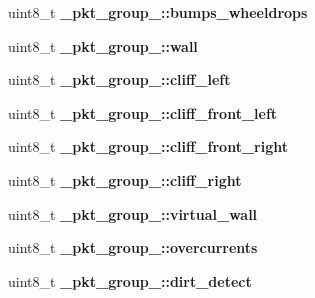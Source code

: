 \begin{DoxyCompactItemize}
\item 
\hypertarget{group__roomba-lib_ga2bbb9856351748fe9b2dc5b4bb64e314}{}uint8\+\_\+t {\bfseries \+\_\+pkt\+\_\+group\+\_\+::bumps\+\_\+wheeldrops}\label{group__roomba-lib_ga2bbb9856351748fe9b2dc5b4bb64e314}

\item 
\hypertarget{group__roomba-lib_gaa6ae5b6cf200fe413bb10c2456e11b44}{}uint8\+\_\+t {\bfseries \+\_\+pkt\+\_\+group\+\_\+::wall}\label{group__roomba-lib_gaa6ae5b6cf200fe413bb10c2456e11b44}

\item 
\hypertarget{group__roomba-lib_gaffe3e98e0a58a11cee7b93932b9bb3e9}{}uint8\+\_\+t {\bfseries \+\_\+pkt\+\_\+group\+\_\+::cliff\+\_\+left}\label{group__roomba-lib_gaffe3e98e0a58a11cee7b93932b9bb3e9}

\item 
\hypertarget{group__roomba-lib_ga29afaba741fbaa8b8a3a3abcdfc67a07}{}uint8\+\_\+t {\bfseries \+\_\+pkt\+\_\+group\+\_\+::cliff\+\_\+front\+\_\+left}\label{group__roomba-lib_ga29afaba741fbaa8b8a3a3abcdfc67a07}

\item 
\hypertarget{group__roomba-lib_ga5df6c2bcee47f121a1f6cef74f5cd58a}{}uint8\+\_\+t {\bfseries \+\_\+pkt\+\_\+group\+\_\+::cliff\+\_\+front\+\_\+right}\label{group__roomba-lib_ga5df6c2bcee47f121a1f6cef74f5cd58a}

\item 
\hypertarget{group__roomba-lib_ga4f0702134fab31fc4f7274813b2145a3}{}uint8\+\_\+t {\bfseries \+\_\+pkt\+\_\+group\+\_\+::cliff\+\_\+right}\label{group__roomba-lib_ga4f0702134fab31fc4f7274813b2145a3}

\item 
\hypertarget{group__roomba-lib_ga6d031bd9a7e62d2c6e26a182497a9033}{}uint8\+\_\+t {\bfseries \+\_\+pkt\+\_\+group\+\_\+::virtual\+\_\+wall}\label{group__roomba-lib_ga6d031bd9a7e62d2c6e26a182497a9033}

\item 
\hypertarget{group__roomba-lib_ga494dc63329054eb34a18b17c7c7e72f0}{}uint8\+\_\+t {\bfseries \+\_\+pkt\+\_\+group\+\_\+::overcurrents}\label{group__roomba-lib_ga494dc63329054eb34a18b17c7c7e72f0}

\item 
\hypertarget{group__roomba-lib_ga78144fefe79b1528974b7e8034ec89e6}{}uint8\+\_\+t {\bfseries \+\_\+pkt\+\_\+group\+\_\+::dirt\+\_\+detect}\label{group__roomba-lib_ga78144fefe79b1528974b7e8034ec89e6}


\end{DoxyCompactItemize}
